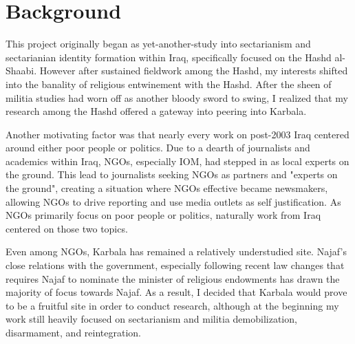 

\section{Background}
This project originally began as yet-another-study into sectarianism and sectarianian identity formation within Iraq, specifically focused on the Hashd al-Shaabi. However after sustained fieldwork among the Hashd, my interests shifted into the banality of religious entwinement with the Hashd. After the sheen of militia studies had worn off as another bloody sword to swing, I realized that my research among the Hashd offered a gateway into peering into Karbala. 

Another motivating factor was that nearly every work on post-2003 Iraq centered around either poor people or politics. Due to a dearth of journalists and academics within Iraq, NGOs, especially IOM, had stepped in as local experts on the ground. This lead to journalists seeking NGOs as partners and "experts on the ground", creating a situation where NGOs effective became newsmakers, allowing NGOs to drive reporting and use media outlets as self justification. As NGOs primarily focus on poor people or politics, naturally work from Iraq centered on those two topics.

Even among NGOs, Karbala has remained a relatively understudied site. Najaf's close relations with the government, especially following recent law changes that requires Najaf to nominate the minister of religious endowments \cite{hamoudi_engagements_2020} has drawn the majority of focus towards Najaf. As a result, I decided that Karbala would prove to be a fruitful site in order to conduct research, although at the beginning my work still heavily focused on sectarianism and militia demobilization, disarmament, and reintegration. 


